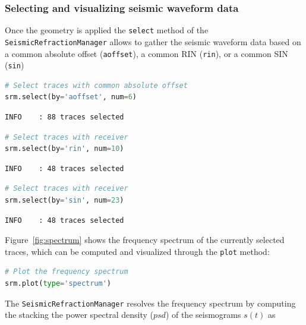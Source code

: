 \documentclass[a4paper,fleqn]{cas-sc}
\begin{document}
\subsubsection{Selecting and visualizing seismic waveform data}
Once the geometry is applied the \texttt{select} method of the \texttt{SeismicRefractionManager} allows to gather the seismic waveform data based on a common absolute offset (\texttt{aoffset}), a common RIN (\texttt{rin}), or a common SIN (\texttt{sin})
\begin{lstlisting}[language=Python, firstnumber=6]
# Select traces with common absolute offset
srm.select(by='aoffset', num=6)
\end{lstlisting}
\begin{footnotesize}
\begin{verbatim}
INFO    : 88 traces selected
\end{verbatim}
\end{footnotesize}
\begin{lstlisting}[language=Python, firstnumber=8]
# Select traces with receiver
srm.select(by='rin', num=10)
\end{lstlisting}
\begin{footnotesize}
\begin{verbatim}
INFO    : 48 traces selected
\end{verbatim}
\end{footnotesize}
\begin{lstlisting}[language=Python, firstnumber=10]
# Select traces with receiver
srm.select(by='sin', num=23)
\end{lstlisting}
\begin{footnotesize}
\begin{verbatim}
INFO    : 48 traces selected
\end{verbatim}
\end{footnotesize}

Figure~\ref{fig:spectrum} shows the frequency spectrum of the currently selected traces, which can be computed and visualized through the \texttt{plot} method:
\begin{lstlisting}[language=Python, firstnumber=12]
# Plot the frequency spectrum
srm.plot(type='spectrum')
\end{lstlisting}
The \texttt{SeismicRefractionManager} resolves the frequency spectrum by computing the stacking the power spectral density ($psd$) of the seismograms $s\left(t\right)$ as
\end{document}
